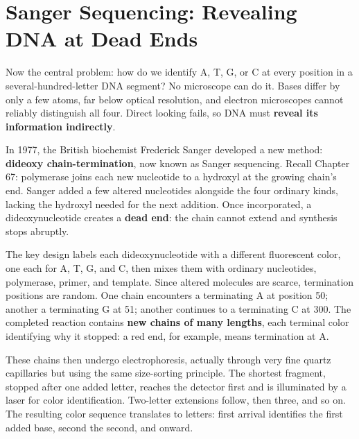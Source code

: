 \section{Sanger Sequencing: Revealing DNA at Dead Ends}

Now the central problem: how do we identify A, T, G, or C at every position in a several-hundred-letter DNA segment? No microscope can do it. Bases differ by only a few atoms, far below optical resolution, and electron microscopes cannot reliably distinguish all four. Direct looking fails, so DNA must \textbf{reveal its information indirectly}.

In 1977, the British biochemist Frederick Sanger developed a new method: \textbf{dideoxy chain-termination}, now known as Sanger sequencing. Recall Chapter 67: polymerase joins each new nucleotide to a hydroxyl at the growing chain's end. Sanger added a few altered nucleotides alongside the four ordinary kinds, lacking the hydroxyl needed for the next addition. Once incorporated, a dideoxynucleotide creates a \textbf{dead end}: the chain cannot extend and synthesis stops abruptly.

The key design labels each dideoxynucleotide with a different fluorescent color, one each for A, T, G, and C, then mixes them with ordinary nucleotides, polymerase, primer, and template. Since altered molecules are scarce, termination positions are random. One chain encounters a terminating A at position 50; another a terminating G at 51; another continues to a terminating C at 300. The completed reaction contains \textbf{new chains of many lengths}, each terminal color identifying why it stopped: a red end, for example, means termination at A.

These chains then undergo electrophoresis, actually through very fine quartz capillaries but using the same size-sorting principle. The shortest fragment, stopped after one added letter, reaches the detector first and is illuminated by a laser for color identification. Two-letter extensions follow, then three, and so on. The resulting color sequence translates to letters: first arrival identifies the first added base, second the second, and onward.

